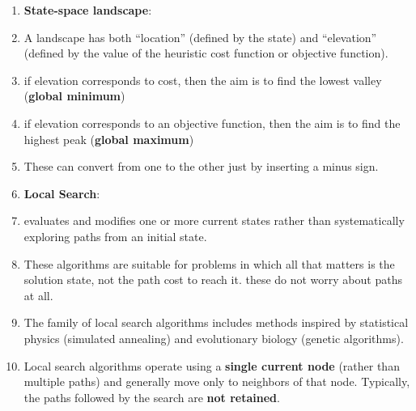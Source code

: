 \begin{enumerate}[itemsep=0.2cm]
    \item[] {\fontsize{18}{18} \textbf{State-space landscape}}:
    
    \item A landscape has both “location” (defined by the state) and “elevation” (defined by the value of the heuristic cost function or objective function).
    \hfill \cite{ai/book/Artificial-Intelligence-A-Modern-Approach/Russell-Norvig}

    \item if elevation corresponds to cost, then the aim is to find the lowest valley (\textbf{global minimum})
    \hfill \cite{ai/book/Artificial-Intelligence-A-Modern-Approach/Russell-Norvig}

    \item if elevation corresponds to an objective function, then the aim is to find the highest peak (\textbf{global maximum})
    \hfill \cite{ai/book/Artificial-Intelligence-A-Modern-Approach/Russell-Norvig}

    \item These can convert from one to the other just by inserting a minus sign.
    \hfill \cite{ai/book/Artificial-Intelligence-A-Modern-Approach/Russell-Norvig}

    \item[] {\fontsize{18}{18} \textbf{Local Search}}:

    \item evaluates and modifies one or more current states rather than systematically exploring paths from an initial state.
    \hfill \cite{ai/book/Artificial-Intelligence-A-Modern-Approach/Russell-Norvig}

    \item These algorithms are suitable for problems in which all that matters is the solution state, not the path cost to reach it.
    these do not worry about paths at all.
    \hfill \cite{ai/book/Artificial-Intelligence-A-Modern-Approach/Russell-Norvig}

    \item The family of local search algorithms includes methods inspired by statistical physics (simulated annealing) and evolutionary biology (genetic algorithms).
    \hfill \cite{ai/book/Artificial-Intelligence-A-Modern-Approach/Russell-Norvig}

    \item Local search algorithms operate using a \textbf{single current node} (rather than multiple paths) and generally move only to neighbors of that node.
    Typically, the paths followed by the search are \textbf{not retained}.
    \hfill \cite{ai/book/Artificial-Intelligence-A-Modern-Approach/Russell-Norvig}


\end{enumerate}
